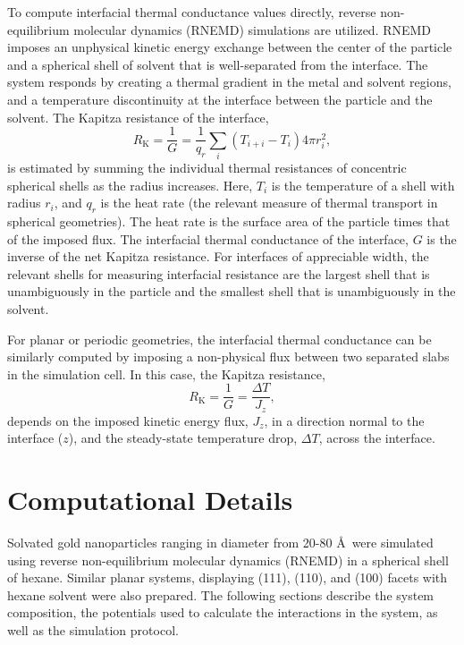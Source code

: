 To compute interfacial thermal conductance values directly,
reverse non-equilibrium molecular dynamics (RNEMD)
simulations are utilized.\cite{Muller-Plathe:1997wq,Kuang:2012fe} RNEMD imposes an
unphysical kinetic energy exchange between the center of the particle
and a spherical shell of solvent that is well-separated from the
interface.  The system responds by creating a thermal gradient in the
metal and solvent regions, and a temperature discontinuity at the
interface between the particle and the solvent. The Kapitza resistance
of the interface,
\begin{equation}
  R_\mathrm{K} = \frac{1}{G} = \frac{1}{q_r} \sum_i \left(T_{i+i} - T_i\right) 4 \pi r_i^2,
  \label{sphericalG}
\end{equation}
is estimated by summing the individual thermal resistances of
concentric spherical shells as the radius
increases.\cite{Stocker:2014qq} Here, $T_i$ is the temperature of a
shell with radius $r_i$, and $q_r$ is the heat rate (the relevant
measure of thermal transport in spherical geometries). The heat rate
is the surface area of the particle times that of the imposed
flux. The interfacial thermal conductance of the interface, $G$ is the
inverse of the net Kapitza resistance.  For interfaces of appreciable
width, the relevant shells for measuring interfacial resistance are
the largest shell that is unambiguously in the particle and the
smallest shell that is unambiguously in the solvent.

For planar or periodic geometries, the interfacial thermal conductance
can be similarly computed by imposing a non-physical flux between two
separated slabs in the simulation cell. In this case, the Kapitza
resistance,
\begin{equation}
  R_\mathrm{K} = \frac{1}{G} = \frac{\Delta T}{J_z},
\label{planarG}
\end{equation}
depends on the imposed kinetic energy flux, $J_z$, in a direction
normal to the interface ($z$), and the steady-state temperature drop,
$\Delta T$, across the interface.\cite{Kuang:2012fe}


\section{Computational Details}

Solvated gold nanoparticles ranging in diameter from 20-80 \AA\ were
simulated using reverse non-equilibrium molecular dynamics (RNEMD) in
a spherical shell of hexane. Similar planar systems, displaying (111),
(110), and (100) facets with hexane solvent were also prepared.  The
following sections describe the system composition, 
the potentials used to calculate the
interactions in the system, as well as the simulation protocol.

